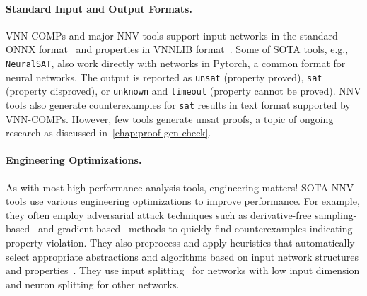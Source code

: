 \documentclass[oneside,11pt,dvipsnames]{book}
\numberwithin{equation}{section}
\theoremstyle{definition}
\theoremstyle{remark}
\newcommand{\crown}{\texttt{$\alpha\beta$-CROWN}}
\newcommand{\neuralsat}{\texttt{NeuralSAT}}
\begin{document}
   
\paragraph{Standard Input and Output Formats.} VNN-COMPs and major NNV tools support input networks in the standard ONNX format~\cite{onnx} and properties in VNNLIB format~\cite{vnnlib}. 
Some of SOTA tools, e.g., \neuralsat{}, also work directly with networks in Pytorch, a common format for neural networks.
The output is reported as \texttt{unsat} (property proved), \texttt{sat} (property disproved), or \texttt{unknown} and \texttt{timeout} (property cannot be proved). NNV tools also generate counterexamples for \texttt{sat} results in text format supported by VNN-COMPs. However, few tools generate unsat proofs, a topic of ongoing research as discussed in~\autoref{chap:proof-gen-check}.

    


\paragraph{Engineering Optimizations.}
As with most high-performance analysis tools, engineering matters! SOTA NNV tools use various engineering optimizations to improve performance.  For example, they often employ adversarial attack techniques such as derivative-free sampling-based~\cite{yu2016derivative} and gradient-based~\cite{madry2017towards} methods to quickly find counterexamples indicating property violation. They also preprocess and apply heuristics that automatically select appropriate abstractions and algorithms based on input network structures and properties~\cite{duong2025neuralsat,duong2024harnessing}. They use input splitting~\cite{duong2025neuralsat,wang2021beta,bak2021nnenum,zhang2022general} for networks with low input dimension and neuron splitting for other networks.
\end{document}
